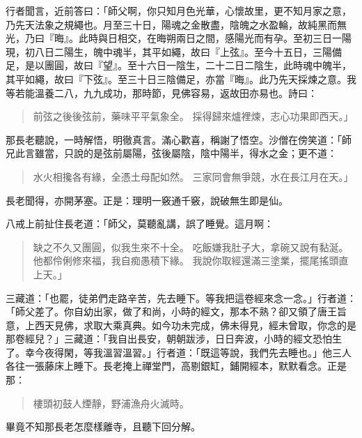 行者聞言，近前答曰：「師父啊，你只知月色光華，心懷故里，更不知月家之意，乃先天法象之規繩也。月至三十日，陽魂之金散盡，陰魄之水盈輪，故純黑而無光，乃曰『晦』。此時與日相交，在晦朔兩日之間，感陽光而有孕。至初三日一陽現，初八日二陽生，魄中魂半，其平如繩，故曰『上弦』。至今十五日，三陽備足，是以團圓，故曰『望』。至十六日一陰生，二十二日二陰生，此時魂中魄半，其平如繩，故曰『下弦』。至三十日三陰備足，亦當『晦』。此乃先天採煉之意。我等若能溫養二八，九九成功，那時節，見佛容易，返故田亦易也。詩曰：
\begin{quote}
前弦之後後弦前，藥味平平氣象全。
採得歸來爐裡煉，志心功果即西天。」
\end{quote}

那長老聽說，一時解悟，明徹真言。滿心歡喜，稱謝了悟空。沙僧在傍笑道：「師兄此言雖當，只說的是弦前屬陽，弦後屬陰，陰中陽半，得水之金；更不道：
\begin{quote}
水火相攙各有緣，全憑土母配如然。
三家同會無爭競，水在長江月在天。」
\end{quote}

長老聞得，亦開茅塞。正是：理明一竅通千竅，說破無生即是仙。

八戒上前扯住長老道：「師父，莫聽亂講，誤了睡覺。這月啊：
\begin{quote}
缺之不久又團圓，似我生來不十全。
吃飯嫌我肚子大，拿碗又說有黏涎。
他都伶俐修來福，我自痴愚積下緣。
我說你取經還滿三塗業，擺尾搖頭直上天。」
\end{quote}

三藏道：「也罷，徒弟們走路辛苦，先去睡下。等我把這卷經來念一念。」行者道：「師父差了。你自幼出家，做了和尚，小時的經文，那本不熟？卻又領了唐王旨意，上西天見佛，求取大乘真典。如今功未完成，佛未得見，經未曾取，你念的是那卷經兒？」三藏道：「我自出長安，朝朝跋涉，日日奔波，小時的經文恐怕生了。幸今夜得閑，等我溫習溫習。」行者道：「既這等說，我們先去睡也。」他三人各往一張藤床上睡下。長老掩上禪堂門，高剔銀缸，鋪開經本，默默看念。正是那：
\begin{quote}
樓頭初鼓人煙靜，野浦漁舟火滅時。
\end{quote}

畢竟不知那長老怎麼樣離寺，且聽下回分解。
